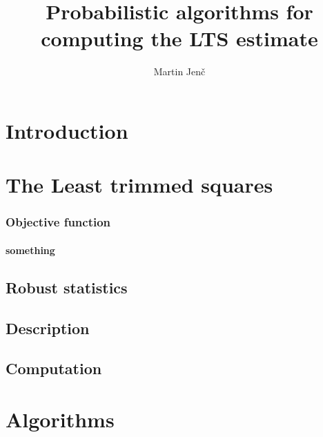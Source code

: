 \documentclass[thesis=B,english]{FITthesis}[2012/10/20]
\title{Probabilistic algorithms for computing the LTS estimate}
\author{Martin Jen{\v c}} %
\begin{document}
%

% 
% 
% 
% 

%




\chapter{Introduction}

\chapter{The Least trimmed squares}
\subsection{Objective function}
\subsubsection{something}

\section{Robust statistics}
\section{Description}
\section{Computation}

\chapter{Algorithms}

\end{document}
